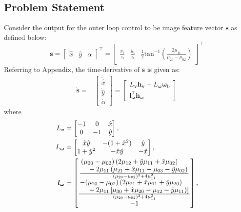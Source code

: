\documentclass[lettersize,journal]{IEEEtran}
\begin{document}
\subsection{Problem Statement} \label{problem statement: section}
Consider the output for the outer loop control to be image feature vector $\boldsymbol{s}$ as defined below:
\begin{equation}
    \boldsymbol{s} = \begin{bmatrix} \hat{x} & \hat{y} & \alpha \end{bmatrix}^{\top} = \begin{bmatrix} \frac{x_{\text{t}}}{z_{\text{t}}} & \frac{y_{\text{t}}}{z_{\text{t}}} & \frac{1}{2} \text{tan}^{-1}\left( \frac{2 \mu_{11}}{\mu_{20} - \mu_{02}}\right)
    \end{bmatrix}^{\top}
\end{equation}
Referring to Appendix, the time-derivative of $\boldsymbol{s}$ is given as:
\begin{align}
    \dot{\boldsymbol{s}} =& \begin{bmatrix} \dot{\hat{x}} \\ \dot{\hat{y}} \\ \dot{\alpha} \end{bmatrix}
    = \begin{bmatrix}
    L_{\boldsymbol{v}} \boldsymbol{h}_{\boldsymbol{v}} + L_{\boldsymbol{\omega}} \boldsymbol{\omega}_{\text{b}} \\
    \boldsymbol{l}_{\boldsymbol{\omega}}^{\top} \boldsymbol{h}_{\boldsymbol{\omega}}
    \end{bmatrix}
\end{align}where 
\begin{align*}
    L_{\boldsymbol{v}} &= \begin{bmatrix} - 1 & 0 & \hat{x} \\ 0 & -1 & \hat{y}\end{bmatrix},\\
    L_{\boldsymbol{\omega}} &= \begin{bmatrix} \hat{x} \hat{y} & - (1 + \hat{x}^2) & \hat{y} \\
    1 + \hat{y}^2 & - \hat{x} \hat{y} & - \hat{x}\end{bmatrix}, \\
    \boldsymbol{l}_{\boldsymbol{\omega}} 
    &= \begin{bmatrix} \frac{\splitfrac{(\mu_{20} - \mu_{02})\left( 2 \mu_{12} + \hat{y} \mu_{11} + \hat{x} \mu_{02} \right) }{ - 2 \mu_{11} \left( \mu_{21} + \hat{x} \mu_{11} - \mu_{03} - \hat{y} \mu_{02} \right)}}{(\mu_{20} - \mu_{02})^2 + 4 \mu_{11}^2} \\ \frac{\splitfrac{ - (\mu_{20} - \mu_{02})\left( 2 \mu_{21} + \hat{x} \mu_{11} + \hat{y} \mu_{20} \right) }{ + 2 \mu_{11} \left[ \mu_{30} + \hat{x} \mu_{20} - \mu_{12} - \hat{y} \mu_{11} ) \right]}}{(\mu_{20} - \mu_{02})^2 + 4 \mu_{11}^2} \\ -1 \end{bmatrix},
\end{align*}
\end{document}
